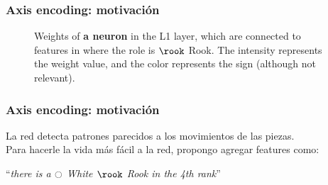 
\begin{frame}
\frametitle{Axis encoding: motivación}
\begin{figure}[h]
\centering
{}%
\qquad
{}%
\caption{Weights of \textbf{a neuron} in the L1 layer, which are connected to features in  where the role is $\rook$ Rook. The intensity represents the weight value, and the color represents the sign (although not relevant).}
\label{fig:rook_weights}
\end{figure}
\end{frame}

\begin{frame}
\frametitle{Axis encoding: motivación}
La red detecta patrones parecidos a los movimientos de las piezas. \pause \\

Para hacerle la vida más fácil a la red, propongo agregar features como:

\begin{center}
\enquote{\textit{there is a $\white$ White $\rook$ Rook in the 4th rank}}
\end{center}

\end{frame}


